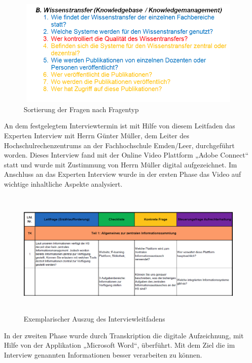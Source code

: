 \documentclass[a4paper]{article}
\begin{document}
\begin{figure}
\centering
\includegraphics[width=11.575cm,height=5.269cm]{EntwurfKapitel2Gruppe220150528VW-img/EntwurfKapitel2Gruppe220150528VW-img003.png}
\caption[Sortierung der Fragen nach Fragentyp]{Sortierung der Fragen nach Fragentyp}

\end{figure}
{\sffamily\mdseries\color{black}
An dem festgelegtem Interviewtermin ist mit Hilfe von diesem Leitfaden das Experten Interview mit Herrn Günter Müller,
dem Leiter des Hochschulrechenzentrums an der Fachhochschule Emden/Leer, durchgeführt worden. Dieses Interview fand mit
der Online Video Plattform „Adobe Connect“ statt und wurde mit Zustimmung von Herrn Müller digital aufgezeichnet. Im
Anschluss an das Experten Interview wurde in der ersten Phase das Video auf wichtige inhaltliche Aspekte analysiert. }

\begin{figure}
\centering
\includegraphics[width=15.501cm,height=6.223cm]{EntwurfKapitel2Gruppe220150528VW-img/EntwurfKapitel2Gruppe220150528VW-img004.png}
\caption[Exemplarischer Auszug des Interviewleitfadens]{Exemplarischer Auszug des Interviewleitfadens}

\end{figure}

\bigskip

{\sffamily\mdseries\color{black}
In der zweiten Phase wurde durch Transkription die digitale Aufzeichnung, mit Hilfe von der Applikation „Microsoft
Word“, überführt. Mit dem Ziel die im Interview genannten Informationen besser verarbeiten zu können. }
\end{document}
